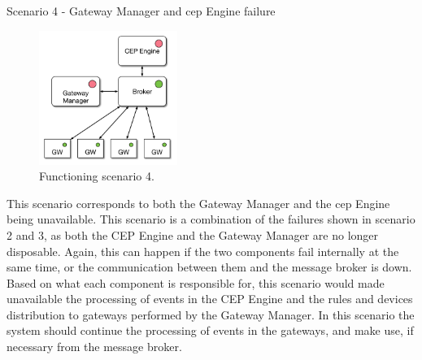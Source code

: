 \begin{Paragraph}{Scenario 4 - Gateway Manager and \ac{cep} Engine failure}
	
	\begin{figure}[H]
		\centering
		\includegraphics[width=0.4\textwidth]{figures/fs4.png}
		\caption{Functioning scenario 4.}
		\label{fig:sc4}
	\end{figure}
	
	This scenario corresponds to both the Gateway Manager and the \ac{cep} Engine being unavailable. This scenario is a combination of the failures shown in scenario 2 and 3, as both the CEP Engine and the Gateway Manager are no longer disposable. Again, this can happen if the two components fail internally at the same time, or the communication between them and the message broker is down. Based on what each component is responsible for, this scenario would made unavailable the processing of events in the CEP Engine and the rules and devices distribution to gateways performed by the Gateway Manager. In this scenario the system should continue the processing of events in the gateways, and make use, if necessary from the message broker.
	
\end{Paragraph}


